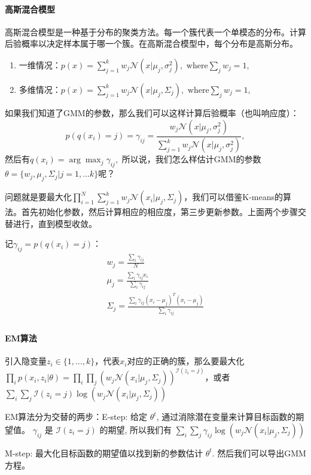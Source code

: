 \paragraph{高斯混合模型}
高斯混合模型是一种基于分布的聚类方法。每一个簇代表一个单模态的分布。计算后验概率以决定样本属于哪一个簇。在高斯混合模型中，每个分布是高斯分布。\begin{enumerate}
    \item 一维情况：$p(x) = \sum_{j=1}^k w_j\mathcal{N}(x|\mu_j, \sigma_j^2),\text{ where} \sum_j w_j = 1,$
    \item 多维情况：$p(x) = \sum_{j=1}^k w_j\mathcal{N}(x|\mu_j, \Sigma_j),\text{ where} \sum_j w_j = 1,$
\end{enumerate}
如果我们知道了GMM的参数，那么我们可以这样计算后验概率（也叫响应度）：
$$p(q(x_i) = j) = \gamma_{ij} = \frac{w_j\mathcal{N}(x|\mu_j, \sigma_j^2)}{\sum_{j=1}^kw_j\mathcal{N}(x|\mu_j, \sigma_j^2)},$$
然后有$q(x_i) = \arg\max_j \gamma_{ij},$
所以说，我们怎么样估计GMM的参数$\theta = \{w_j, \mu_j, \Sigma_j | j = 1, \ldots k\}$呢？

问题就是要最大化$\prod_{i=1}^N \sum_{j=1}^k w_j \mathcal{N}(x_i|\mu_j, \Sigma_j)$，我们可以借鉴K-means的算法。首先初始化参数，然后计算相应的相应度，第三步更新参数。上面两个步骤交替进行，直到模型收敛。

记$\gamma_{ij} = p(q(x_i) = j)$：$$
\begin{aligned}
    w_j = \frac{\sum_i \gamma_{ij}}{N} \\
    \mu_j = \frac{\sum_i \gamma_{ij}x_i}{\sum_i \gamma_{ij}} \\
    \Sigma_j = \frac{\sum_i \gamma_{ij}(x_i - \mu_j)^T(x_i - \mu_j)}{\sum_i \gamma_{ij}} \\
\end{aligned}
$$

\paragraph{EM算法}
引入隐变量$z_i \in \{1, \ldots, k\}$，代表$x_i$对应的正确的簇，那么要最大化$\prod_i p(x_i, z_i|\theta) = \prod_i \prod_j (w_j\mathcal{N}(x_i|\mu_j, \Sigma_j))^{\mathcal{I}(z_i =j)}$，或者$\sum_i \sum_j \mathcal{I}(z_i =j)\log(w_j\mathcal{N}(x_i|\mu_j, \Sigma_j))$

EM算法分为交替的两步：E-step: 给定 $\theta^t$, 通过消除潜在变量来计算目标函数的期望值。 $\gamma_{ij}$ 是 $\mathcal{I}(z_i = j)$ 的期望, 所以我们有 $\sum_i\sum_j \gamma_{ij} \log(w_j\mathcal{N}(x_i|\mu_j, \Sigma_j))$

M-step: 最大化目标函数的期望值以找到新的参数估计 $\theta^t$. 然后我们可以导出GMM方程。


